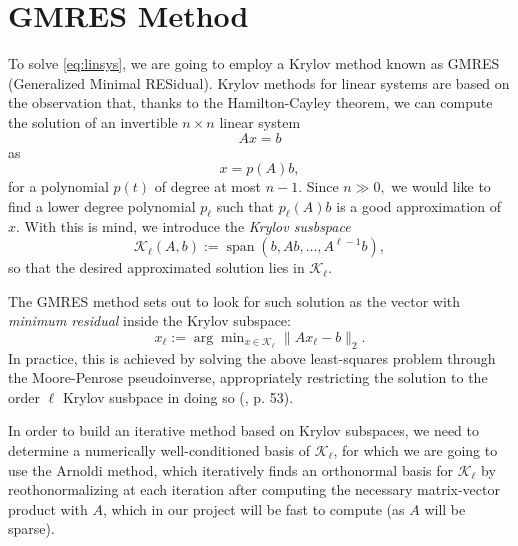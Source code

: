 \documentclass[a4paper]{article}
\theoremstyle{definition}
\theoremstyle{definition}
\theoremstyle{remark}
\theoremstyle{definition}
\begin{document}
\section{GMRES Method}
To solve \eqref{eq:linsys}, we are going to employ a Krylov method known as GMRES (Generalized Minimal RESidual). Krylov methods for linear systems are based on the observation
that, thanks to the Hamilton-Cayley theorem, we can compute the solution of an invertible $n\times n$ linear system $$Ax=b$$ as $$x=p(A)b,$$ for a polynomial $p(t)$ of degree at
most $n-1$. Since $n\gg0,$ we would like to find a lower degree polynomial $p_\ell$ such that $p_\ell(A)b$ is a good approximation of $x$.
With this is mind, we introduce the \textit{Krylov susbspace}
\begin{equation}\label{eq:krylov}
 \mathcal{K}_\ell(A,b):=\operatorname{span}{(b,Ab,\dots,A^{\ell-1}b)},
\end{equation}
so that the desired approximated solution lies in $\mathcal{K}_\ell$.

The GMRES method sets out to look for such solution as the vector with \textit{minimum residual} inside the Krylov subspace:
$$ x_\ell:=\arg\min\nolimits_{x\in\mathcal{K}_\ell}{\|Ax_\ell-b\|_2} .$$
In practice, this is achieved by solving the above least-squares problem through the Moore-Penrose pseudoinverse, appropriately restricting the solution to the order $\ell$ Krylov
susbpace in doing so (\cite{notes}, p. 53).

In order to build an iterative method based on Krylov subspaces, we need to determine a numerically well-conditioned basis of $\mathcal{K}_\ell$, for which we are going to use the Arnoldi
method, which iteratively finds an orthonormal basis for $\mathcal{K}_\ell$ by reothonormalizing at each iteration after computing the necessary matrix-vector product with $A$,
which in our project will be fast to compute (as $A$ will be sparse).
\end{document}
